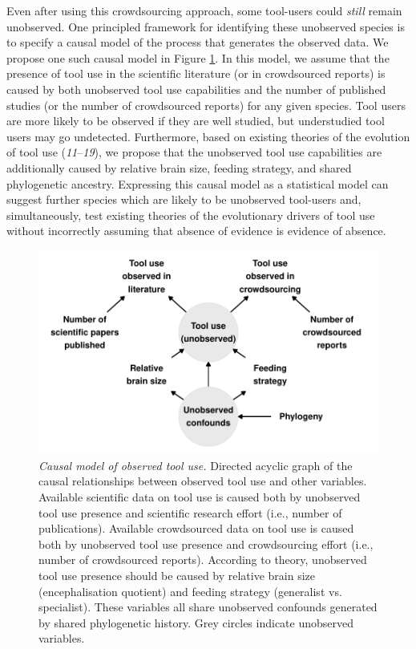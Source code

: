 \documentclass[
  man,floatsintext]{apa6}
\begin{document}
Even after using this crowdsourcing approach, some tool-users could \emph{still}
remain unobserved. One principled framework for identifying these unobserved species
is to specify a causal model of the process that generates the observed data. We
propose one such causal model in Figure \ref{fig:plotDAG}. In this model, we
assume that the presence of tool use in the scientific literature (or in
crowdsourced reports) is caused by both unobserved tool use capabilities and the
number of published studies (or the number of crowdsourced reports) for any
given species. Tool users are more likely to be observed if they are well
studied, but understudied tool users may go undetected. Furthermore, based on
existing theories of the evolution of tool use (\emph{11}--\emph{19}), we propose that the
unobserved tool use capabilities are additionally caused by relative brain size,
feeding strategy, and shared phylogenetic ancestry. Expressing this causal model
as a statistical model can suggest further species which are likely to be
unobserved tool-users and, simultaneously, test existing theories of the
evolutionary drivers of tool use without incorrectly assuming that absence of
evidence is evidence of absence.












\begin{figure}
\centering
\includegraphics{manuscript_files/figure-latex/plotDAG-1.pdf}
\caption{\label{fig:plotDAG}\emph{Causal model of observed tool use.} Directed acyclic graph
of the causal relationships between observed tool use and other variables.
Available scientific data on tool use is caused both by unobserved tool use
presence and scientific research effort (i.e., number of publications).
Available crowdsourced data on tool use is caused both by unobserved tool use
presence and crowdsourcing effort (i.e., number of crowdsourced reports).
According to theory, unobserved tool use presence should be caused by relative
brain size (encephalisation quotient) and feeding strategy (generalist vs.~
specialist). These variables all share unobserved confounds generated by shared
phylogenetic history. Grey circles indicate unobserved variables.}
\end{figure}
\end{document}
